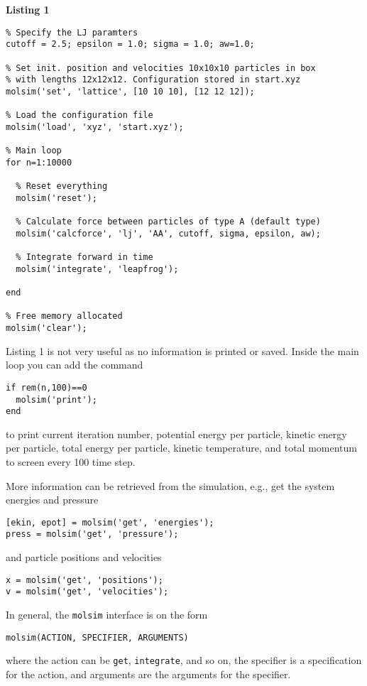 \documentclass[11pt]{article}
\begin{document}
\bigskip

\noindent \textbf{Listing 1}
\begin{verbatim}
% Specify the LJ paramters
cutoff = 2.5; epsilon = 1.0; sigma = 1.0; aw=1.0;

% Set init. position and velocities 10x10x10 particles in box
% with lengths 12x12x12. Configuration stored in start.xyz
molsim('set', 'lattice', [10 10 10], [12 12 12]);

% Load the configuration file
molsim('load', 'xyz', 'start.xyz');

% Main loop
for n=1:10000

  % Reset everything
  molsim('reset');

  % Calculate force between particles of type A (default type)
  molsim('calcforce', 'lj', 'AA', cutoff, sigma, epsilon, aw);

  % Integrate forward in time
  molsim('integrate', 'leapfrog');
 
end

% Free memory allocated
molsim('clear');
\end{verbatim}
Listing 1 is not very useful as no information is printed or saved. Inside the
main loop you can add the command
\begin{verbatim}
if rem(n,100)==0
  molsim('print');
end
\end{verbatim}
to print current iteration number, potential energy per particle, kinetic energy
per particle, total energy per particle, kinetic temperature, and total momentum
to screen every 100 time step.

More information can be retrieved from the simulation, e.g., get the system
energies and pressure 
\begin{verbatim}
[ekin, epot] = molsim('get', 'energies');
press = molsim('get', 'pressure');
\end{verbatim}
and particle positions and velocities
\begin{verbatim}
x = molsim('get', 'positions');
v = molsim('get', 'velocities');
\end{verbatim}
In general, the \verb!molsim! interface is on the form
\begin{verbatim}
molsim(ACTION, SPECIFIER, ARGUMENTS)
\end{verbatim}
where the action can be \verb!get!, \verb!integrate!, and so on, the specifier
is a specification for the action, and arguments are the arguments for the
specifier. 
\end{document}
